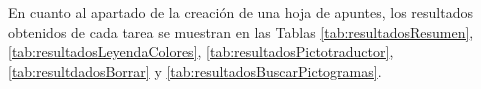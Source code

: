 En cuanto al apartado de la creación de una hoja de apuntes, los resultados obtenidos de cada tarea se muestran en las Tablas \ref{tab:resultadosResumen}, \ref{tab:resultadosLeyendaColores}, \ref{tab:resultadosPictotraductor}, \ref{tab:resultdadosBorrar} y \ref{tab:resultadosBuscarPictogramas}.

\begin{table}[H]
\end{table}
